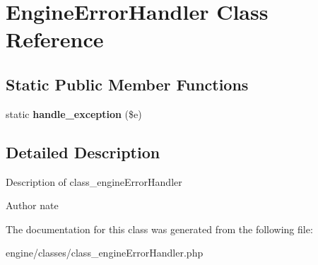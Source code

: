 \hypertarget{classEngineErrorHandler}{\section{Engine\-Error\-Handler Class Reference}
\label{classEngineErrorHandler}
}
\subsection*{Static Public Member Functions}
\begin{DoxyCompactItemize}
\item 
\hypertarget{classEngineErrorHandler_a74dfb9dd312df8a64aeaf832d8bea86c}{static {\bfseries handle\-\_\-exception} (\$e)}\label{classEngineErrorHandler_a74dfb9dd312df8a64aeaf832d8bea86c}

\end{DoxyCompactItemize}


\subsection{Detailed Description}
Description of class\-\_\-engine\-Error\-Handler

\begin{DoxyAuthor}{Author}
nate 
\end{DoxyAuthor}


The documentation for this class was generated from the following file\-:\begin{DoxyCompactItemize}
\item 
engine/classes/class\-\_\-engine\-Error\-Handler.\-php\end{DoxyCompactItemize}
